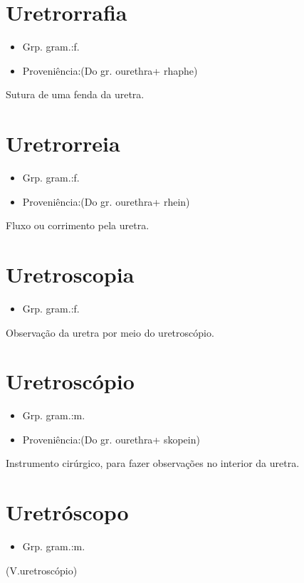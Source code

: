 \documentclass{article}
\begin{document}
\section{Uretrorrafia}
\begin{itemize}
\item {Grp. gram.:f.}
\end{itemize}
\begin{itemize}
\item {Proveniência:(Do gr. \textunderscore ourethra\textunderscore  + \textunderscore rhaphe\textunderscore )}
\end{itemize}
Sutura de uma fenda da uretra.
\section{Uretrorreia}
\begin{itemize}
\item {Grp. gram.:f.}
\end{itemize}
\begin{itemize}
\item {Proveniência:(Do gr. \textunderscore ourethra\textunderscore  + \textunderscore rhein\textunderscore )}
\end{itemize}
Fluxo ou corrimento pela uretra.
\section{Uretroscopia}
\begin{itemize}
\item {Grp. gram.:f.}
\end{itemize}
Observação da uretra por meio do uretroscópio.
\section{Uretroscópio}
\begin{itemize}
\item {Grp. gram.:m.}
\end{itemize}
\begin{itemize}
\item {Proveniência:(Do gr. \textunderscore ourethra\textunderscore  + \textunderscore skopein\textunderscore )}
\end{itemize}
Instrumento cirúrgico, para fazer observações no interior da uretra.
\section{Uretróscopo}
\begin{itemize}
\item {Grp. gram.:m.}
\end{itemize}
(V.uretroscópio)
\end{document}
